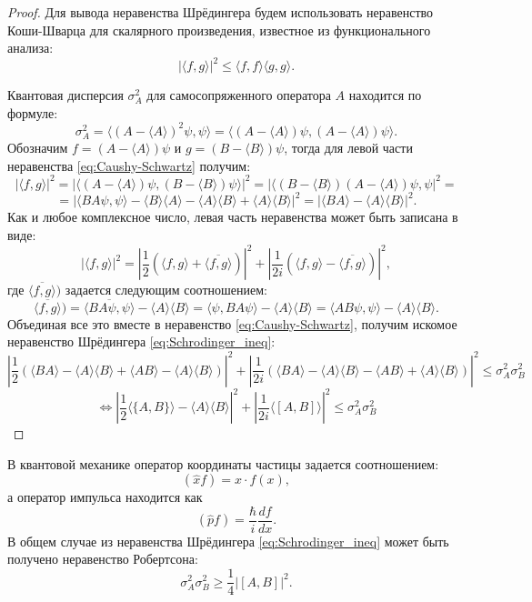 \documentclass[11pt]{article}
\begin{document}
\begin{proof}
Для вывода неравенства Шрёдингера будем использовать неравенство Коши-Шварца для скалярного произведения, известное из функционального анализа:
\begin{equation}
|\langle f, g\rangle |^2 \leq \langle f, f\rangle \langle g, g\rangle. \label{eq:Caushy-Schwartz}
\end{equation}

Квантовая дисперсия $\sigma^2_A$ для самосопряженного оператора $A$ находится по формуле:
\[
\sigma_A^2 = \langle (A - \langle A\rangle)^2\psi, \psi\rangle = \langle  (A - \langle A\rangle)\psi,  (A - \langle A\rangle)\psi\rangle.
\]
Обозначим $f = (A - \langle A\rangle)\psi$ и $g = (B - \langle B\rangle)\psi$, тогда для левой части неравенства \eqref{eq:Caushy-Schwartz} получим:
\[
|\langle f, g\rangle |^2 = |\langle (A - \langle A\rangle)\psi, (B - \langle B\rangle)\psi\rangle |^2 = |\langle (B - \langle B\rangle)(A - \langle A\rangle)\psi, \psi |^2 = 
\]
\[
= | \langle BA\psi, \psi\rangle - \langle B\rangle\langle A\rangle - \langle A\rangle \langle B\rangle + \langle A\rangle\langle B\rangle |^2 = | \langle BA\rangle - \langle A\rangle\langle B\rangle |^2.
\]
Как и любое комплексное число, левая часть неравенства может быть записана в виде:
\[
|\langle f, g\rangle |^2 = \left| \frac{1}{2}(\langle f, g\rangle + \overline{\langle f, g\rangle})\right|^2 + \left| \frac{1}{2i}(\langle f, g\rangle - \overline{\langle f, g\rangle})\right|^2, 
\]
где $\overline{\langle f, g\rangle})$ задается следующим соотношением:
\[
\overline{\langle f, g\rangle}) = \overline{\langle BA\psi, \psi\rangle} - \langle A\rangle\langle B\rangle = \langle\psi, BA\psi\rangle - \langle A\rangle\langle B\rangle = \langle AB\psi, \psi\rangle - \langle A\rangle\langle B\rangle.
\]
Объединая все это вместе в неравенство \eqref{eq:Caushy-Schwartz}, получим искомое неравенство Шрёдингера \eqref{eq:Schrodinger_ineq}:
\[
\left| \frac{1}{2}(\langle BA\rangle - \langle A\rangle\langle B\rangle + \langle AB\rangle - \langle A\rangle\langle B\rangle)\right|^2 + \left| \frac{1}{2i}(\langle BA\rangle - \langle A\rangle\langle B\rangle - \langle AB\rangle + \langle A\rangle\langle B\rangle)\right|^2 \leq \sigma_A^2\sigma_B^2
\]
\[
\Leftrightarrow \left| \frac{1}{2}\langle\{A, B\}\rangle - \langle A\rangle\langle B\rangle \right|^2 + \left| \frac{1}{2i}\langle [A, B]\rangle\right|^2 \leq \sigma_A^2\sigma_B^2
\]
\end{proof}

В квантовой механике оператор координаты частицы задается соотношением:
\[
(\hat{x}f) = x\cdot f(x),
\]
а оператор импульса находится как
\[
(\hat{p}f) = \frac{\hbar}{i}\frac{df}{dx}.
\]
В общем случае из неравенства Шрёдингера  \eqref{eq:Schrodinger_ineq} может быть получено неравенство Робертсона:
\[
\sigma_A^2\sigma_B^2 \geq \frac{1}{4}|[A, B]|^2.
\]
\end{document}
